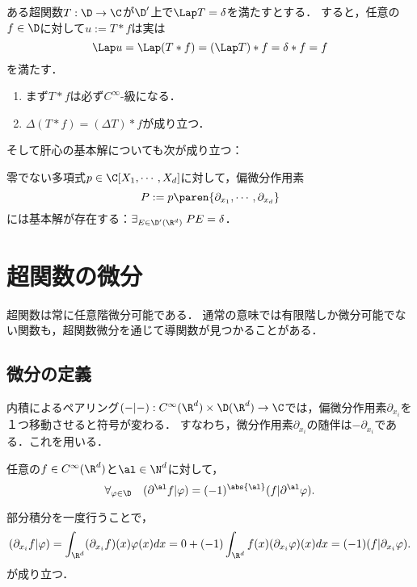 \documentclass[uplatex,dvipdfmx]{jsreport}
\begin{document}
\begin{example}[Poisson方程式の基本解の意味が明確になる]
    ある超関数$T:\D\to\C$が$\D'$上で$\Lap T=\delta$を満たすとする．
    すると，任意の$f\in\D$に対して$u:=T*f$は実は
    \[\Lap u=\Lap(T*f)=(\Lap T)*f=\delta *f=f\]
    を満たす．
    \begin{enumerate}
        \item まず$T*f$は必ず$C^\infty$-級になる．
        \item $\Delta(T*f)=(\Delta T)*f$が成り立つ．
    \end{enumerate}
    そして肝心の基本解についても次が成り立つ：
\end{example}

\begin{theorem}
    零でない多項式$p\in\C[X_1,\cdots,X_d]$に対して，偏微分作用素
    \[P:=p\paren{\partial_{x_1},\cdots,\partial_{x_d}}\]
    には基本解が存在する：$\exists_{E\in\D'(\R^d)}\;PE=\delta$．
\end{theorem}

\section{超関数の微分}

\begin{tcolorbox}[colframe=ForestGreen, colback=ForestGreen!10!white,breakable,colbacktitle=ForestGreen!40!white,coltitle=black,fonttitle=\bfseries\sffamily,
title=]
    超関数は常に任意階微分可能である．
    通常の意味では有限階しか微分可能でない関数も，超関数微分を通じて導関数が見つかることがある．
\end{tcolorbox}

\subsection{微分の定義}

\begin{tcolorbox}[colframe=ForestGreen, colback=ForestGreen!10!white,breakable,colbacktitle=ForestGreen!40!white,coltitle=black,fonttitle=\bfseries\sffamily,
title=微分作用素の随伴を通じた延長]
    内積によるペアリング$(-|-):C^\infty(\R^d)\times\D(\R^d)\to\C$では，偏微分作用素$\partial_{x_i}$を１つ移動させると符号が変わる．
    すなわち，微分作用素$\partial_{x_i}$の随伴は$-\partial_{x_i}$である．これを用いる．
\end{tcolorbox}

\begin{observation}[微分作用素の移動]\label{observation-derivative-through-pairing}
    任意の$f\in C^\infty(\R^d)$と$\al\in\N^d$に対して，
    \[\forall_{\varphi\in\D}\quad(\partial^\al f|\varphi)=(-1)^{\abs{\al}}(f|\partial^\al\varphi).\]
\end{observation}
\begin{Proof}
    部分積分を一度行うことで，
    \[(\partial_{x_i} f|\varphi)=\int_{\R^d}(\partial_{x_i}f)(x)\varphi(x)dx=0+(-1)\int_{\R^d}f(x)(\partial_{x_i}\varphi)(x)dx=(-1)(f|\partial_{x_i}\varphi).\]
    が成り立つ．
\end{Proof}
\end{document}
